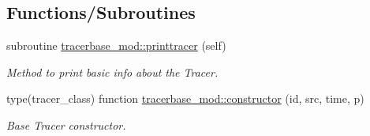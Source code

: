 \subsection*{Functions/\+Subroutines}
\begin{DoxyCompactItemize}
\item 
subroutine \mbox{\hyperlink{namespacetracerbase__mod_ae320123e374df674769dbd48ba5ef46f}{tracerbase\+\_\+mod\+::printtracer}} (self)
\begin{DoxyCompactList}\small\item\em Method to print basic info about the Tracer. \end{DoxyCompactList}\item 
type(tracer\+\_\+class) function \mbox{\hyperlink{namespacetracerbase__mod_aefc12c2007d7598ff9b35733b430a3a2}{tracerbase\+\_\+mod\+::constructor}} (id, src, time, p)
\begin{DoxyCompactList}\small\item\em Base Tracer constructor. \end{DoxyCompactList}\end{DoxyCompactItemize}
